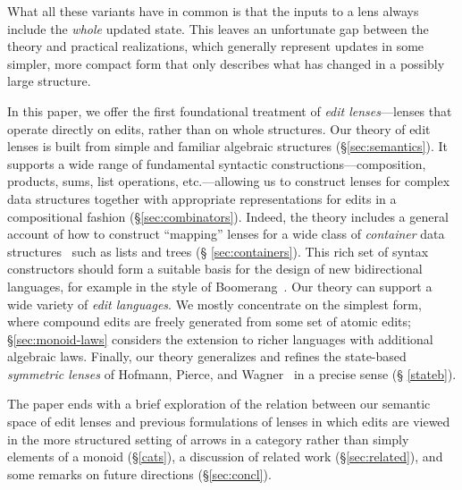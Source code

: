 \documentclass{sigplanconf}
\begin{document}
What all these variants have in common is that the inputs to a lens
always include the {\em whole} updated state.  This leaves an
unfortunate gap between the theory and practical realizations, which
generally represent updates in some simpler, more compact form that
only describes what has changed in a possibly large structure.

In this paper, we offer the first foundational treatment
of {\em edit lenses}---lenses that operate directly on edits, rather
than on whole structures.
%
Our theory of edit lenses is built from simple and familiar algebraic
structures (\S \ref{sec:semantics}).
%
It supports a wide range of fundamental syntactic
constructions---composition, products, sums, list operations,
etc.---allowing us to construct lenses for complex data structures
together with appropriate representations for edits in a
compositional fashion (\S \ref{sec:combinators}).
%
Indeed, the theory includes a general account of how to construct
``mapping'' lenses for a wide class of {\em container} data
structures~\cite{1195941} such as lists and trees (\S
\ref{sec:containers}).  This rich set of syntax constructors should
form a suitable basis for the design of new bidirectional languages,
for example in the style of Boomerang~\cite{Matching10}.
%
Our theory can support a wide variety of {\em edit languages}.  We mostly
concentrate on the simplest form, where compound edits are freely
generated from some set of atomic edits; \S \ref{sec:monoid-laws}
considers the extension to richer languages with additional algebraic laws.
%
Finally, our theory generalizes and refines the
state-based {\em symmetric lenses} of Hofmann, Pierce, and
Wagner~\cite{HofmannPierceWagner10} in a precise sense (\S
\ref{stateb}).  \iffull

\fi
The paper ends with \iffull a brief exploration of the relation between our
semantic space of edit lenses and previous formulations of lenses in which
edits are viewed in the more structured setting of arrows in a category
rather than simply elements of a monoid (\S \ref{cats}), \fi a discussion of
related work (\S \ref{sec:related})\iffull,\fi{} and some remarks on future
directions (\S \ref{sec:concl}).

\iflater {}  \fi

\iflater
{}
\fi
\end{document}
